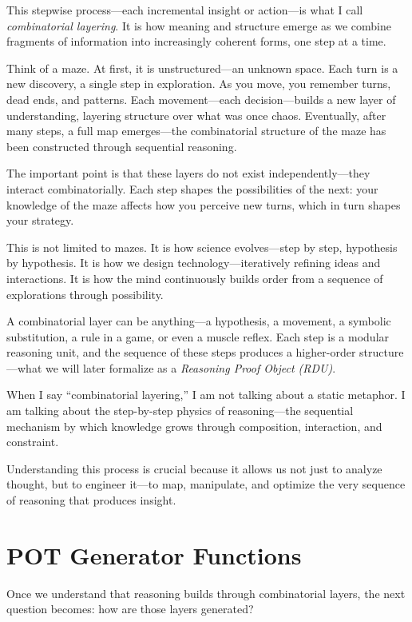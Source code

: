 \documentclass[11pt]{article}
\begin{document}
This stepwise process---each incremental insight or action---is what I call \textit{combinatorial layering}. It is how meaning and structure emerge as we combine fragments of information into increasingly coherent forms, one step at a time.

Think of a maze. At first, it is unstructured---an unknown space. Each turn is a new discovery, a single step in exploration. As you move, you remember turns, dead ends, and patterns. Each movement---each decision---builds a new layer of understanding, layering structure over what was once chaos. Eventually, after many steps, a full map emerges---the combinatorial structure of the maze has been constructed through sequential reasoning.

The important point is that these layers do not exist independently---they interact combinatorially. Each step shapes the possibilities of the next: your knowledge of the maze affects how you perceive new turns, which in turn shapes your strategy.

This is not limited to mazes. It is how science evolves---step by step, hypothesis by hypothesis. It is how we design technology---iteratively refining ideas and interactions. It is how the mind continuously builds order from a sequence of explorations through possibility.

A combinatorial layer can be anything---a hypothesis, a movement, a symbolic substitution, a rule in a game, or even a muscle reflex. Each step is a modular reasoning unit, and the sequence of these steps produces a higher-order structure---what we will later formalize as a \textit{Reasoning Proof Object (RDU)}.

When I say ``combinatorial layering,'' I am not talking about a static metaphor. I am talking about the step-by-step physics of reasoning---the sequential mechanism by which knowledge grows through composition, interaction, and constraint.

Understanding this process is crucial because it allows us not just to analyze thought, but to engineer it---to map, manipulate, and optimize the very sequence of reasoning that produces insight.

\section{POT Generator Functions}

Once we understand that reasoning builds through combinatorial layers, the next question becomes: how are those layers generated?
\end{document}
